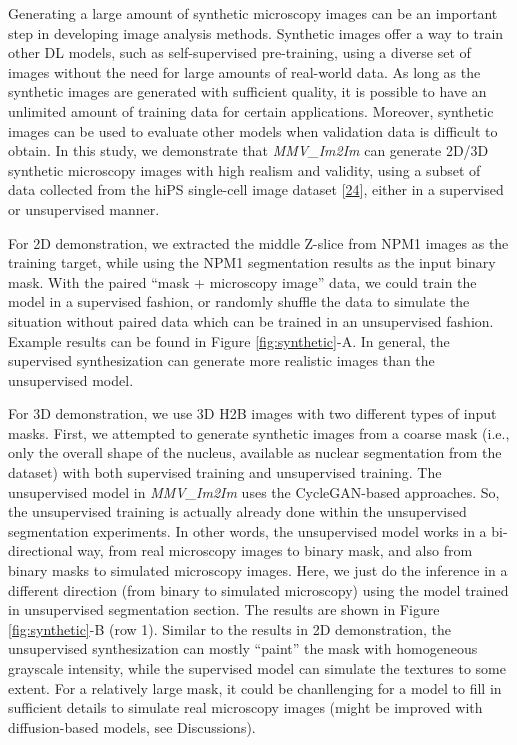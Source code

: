 Generating a large amount of synthetic microscopy images can be an important step in developing image analysis methods. Synthetic images offer a way to train other DL models, such as self-supervised pre-training, using a diverse set of images without the need for large amounts of real-world data. As long as the synthetic images are generated with sufficient quality, it is possible to have an unlimited amount of training data for certain applications. Moreover, synthetic images can be used to evaluate other models when validation data is difficult to obtain. In this study, we demonstrate that \emph{MMV\_Im2Im} can generate 2D/3D synthetic microscopy images with high realism and validity, using a subset of data collected from the hiPS single-cell image dataset {[}\protect\hyperlink{ref-5sGcmDuy}{24}{]}, either in a supervised or unsupervised manner.

For 2D demonstration, we extracted the middle Z-slice from NPM1 images as the training target, while using the NPM1 segmentation results as the input binary mask. With the paired ``mask + microscopy image'' data, we could train the model in a supervised fashion, or randomly shuffle the data to simulate the situation without paired data which can be trained in an unsupervised fashion. Example results can be found in Figure \ref{fig:synthetic}-A. In general, the supervised synthesization can generate more realistic images than the unsupervised model.

For 3D demonstration, we use 3D H2B images with two different types of input masks. First, we attempted to generate synthetic images from a coarse mask (i.e., only the overall shape of the nucleus, available as nuclear segmentation from the dataset) with both supervised training and unsupervised training. The unsupervised model in \emph{MMV\_Im2Im} uses the CycleGAN-based approaches. So, the unsupervised training is actually already done within the unsupervised segmentation experiments. In other words, the unsupervised model works in a bi-directional way, from real microscopy images to binary mask, and also from binary masks to simulated microscopy images. Here, we just do the inference in a different direction (from binary to simulated microscopy) using the model trained in unsupervised segmentation section. The results are shown in Figure \ref{fig:synthetic}-B (row 1). Similar to the results in 2D demonstration, the unsupervised synthesization can mostly ``paint'' the mask with homogeneous grayscale intensity, while the supervised model can simulate the textures to some extent. For a relatively large mask, it could be chanllenging for a model to fill in sufficient details to simulate real microscopy images (might be improved with diffusion-based models, see Discussions).

